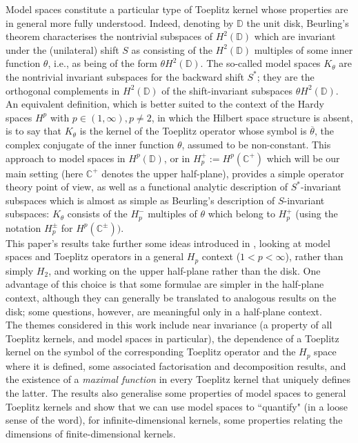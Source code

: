 \documentclass[11pt]{article}
\def\CC{\mathbb{C}}
\def\ol{\overline}
\numberwithin{equation}{section}
\begin{document}
Model spaces constitute a particular type of Toeplitz kernel whose properties are in general more fully understood.
Indeed, denoting by $\mathbb{D}$ the unit disk, Beurling's theorem characterises the nontrivial subspaces of $H^2(\mathbb D)$ which are invariant under the (unilateral) shift $S$ as consisting of the $H^2(\mathbb D)$ multiples of some inner function $\theta$, i.e., as being of the form $\theta H^2(\mathbb D)$. The so-called model spaces $K_\theta$ are the nontrivial invariant subspaces for the backward shift $S^*$; they are the orthogonal complements in $H^2(\mathbb D)$ of the shift-invariant subspaces $\theta H^2(\mathbb D)$.\\

An equivalent definition, which is better suited to   the context of the Hardy spaces $H^p$ with $p\in (1,\infty), p\neq 2$, in which the Hilbert space structure is absent, is to say that $K_\theta$ is the kernel of the Toeplitz operator whose symbol is $\ol \theta$, the complex conjugate of the inner function $\theta$, assumed to be non-constant.
This approach to model spaces in $H^p(\mathbb D)$, or in $H_p^+:= H^p(\mathbb C^+)$ which will be our main setting (here $\CC^+$ denotes the upper half-plane), provides a simple operator theory point of view, as well as a functional analytic description of $S^*$-invariant subspaces which is almost as simple as Beurling's description of $S$-invariant subspaces: $K_\theta$ consists of the $H_p^-$ multiples of $\theta$ which belong to $H_p^+$ (using the notation $H_p^\pm$ for $H^p({\mathbb C}^\pm))$.\\


This paper's results
take further some ideas introduced
in \cite{CP14}, looking at model spaces and Toeplitz
operators in a general $H_p$ context ($1<p<\infty$),
rather than simply $H_2$, and working on the upper half-plane rather than the disk. One advantage of this choice is that some formulae are simpler in the half-plane context, although they can generally be translated to
analogous results on the disk; some questions, however, are meaningful only in a half-plane context.\\

The themes considered in this work include near invariance (a property of all Toeplitz kernels, and model spaces in particular), the dependence of a Toeplitz kernel on the symbol of the corresponding Toeplitz operator and the $H_p$ space where it is defined, some associated factorisation and decomposition results, and the
existence of a {\em maximal function\/} in every Toeplitz kernel that uniquely defines the latter.
The results also generalise some properties of model spaces to general Toeplitz kernels and show that we can use model spaces to ``quantify" (in a loose sense of the word), for infinite-dimensional kernels, some properties relating the dimensions of finite-dimensional kernels.\\
\end{document}
